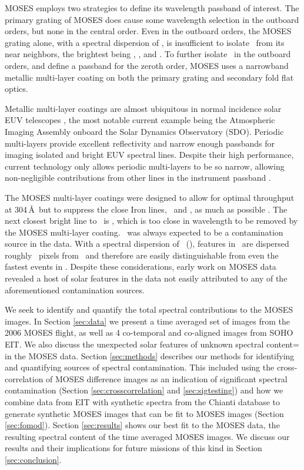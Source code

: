	MOSES employs two strategies to define its wavelength passband of interest.
	The primary grating of MOSES does cause some wavelength selection in the outboard orders, but none in the central order.
	Even in the outboard orders, the MOSES grating alone, with a spectral dispersion of \spectdisperspix, is insufficient to isolate \heii \ from its near neighbors, the brightest being \sixi, \fexv, and \fexvi.
	To further isolate \heii\ in the outboard orders, and define a passband for the zeroth order, MOSES uses a narrowband metallic multi-layer coating on both the primary grating and secondary fold flat optics.
		
	Metallic multi-layer coatings are almost ubiquitous in normal incidence solar EUV telescopes \citep{Windt2015}, the most notable current example being the Atmospheric Imaging Assembly \citep[AIA:][]{lemen2011} onboard the Solar Dynamics Observatory (SDO).
	Periodic multi-layers provide excellent reflectivity and narrow enough passbands for imaging isolated and bright EUV spectral lines.
	Despite their high performance, current technology only allows periodic multi-layers to be so narrow, allowing non-negligible contributions from other lines in the instrument passband \citep{AIA-Response}.
	
	The MOSES multi-layer coatings were designed to allow for optimal throughput at 304\,\AA \ but to suppress the close Iron lines, \fexv\ and \fexvi, as much as possible \citep{Owens2005}.
	The next closest bright line to \heii\ is \sixi, which is too close in wavelength to be removed by the MOSES multi-layer coating.
	\sixi\ was always expected to be a contamination source in the data.
	With a spectral dispersion of \spectdisperspix\ (\spectdispersvel), features in \sixi \ are dispersed roughly \sixipix\ pixels from \heii \ and therefore are easily distinguishable from even the fastest events in \heii.
	Despite these considerations, early work on MOSES data revealed a host of solar features in the data not easily attributed to any of the aforementioned contamination sources.
	
	We seek to identify and quantify the total spectral contributions to the MOSES images.
	In Section \ref{sec:data} we present a time averaged set of images from the 2006 MOSES flight, as well as 4 co-temporal and co-aligned images from SOHO EIT.
	We also discuss the unexpected solar features of unknown spectral content= in the MOSES data.
	Section \ref{sec:methods} describes our methods for identifying and quantifying sources of spectral contamination.  
	This included using the cross-correlation of MOSES difference images as an indication of significant spectral contamination (Section \ref{sec:crosscorrelation} and \ref{sec:sigtesting}) and how we combine data from EIT with synthetic spectra from the Chianti database \citep{ChiantiI,ChiantiX} to generate synthetic MOSES images that can be fit to MOSES images (Section \ref{sec:fomod}).
	Section \ref{sec:results} shows our best fit to the MOSES data, the resulting spectral content of the time averaged MOSES images.
	We discuss our results and their implications for future missions of this kind in Section \ref{sec:conclusion}.   


